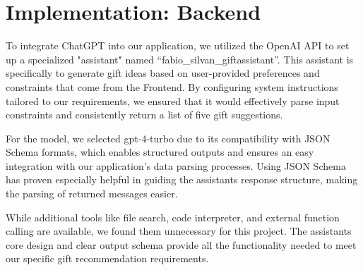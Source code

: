 \chapter{Implementation: Backend}
\label{chapter:implementation-bakend}

To integrate ChatGPT into our application, we utilized the OpenAI API to set up a specialized "assistant" named ``fabio\_silvan\_giftassistant''.
This assistant is specifically to generate gift ideas based on user-provided preferences and constraints that come from the Frontend.
By configuring system instructions tailored to our requirements, we ensured that it would effectively parse input constraints and consistently return a list of five gift suggestions.

For the model, we selected gpt-4-turbo due to its compatibility with JSON Schema formats, which enables structured outputs and ensures an easy integration with our application's data parsing processes.
Using JSON Schema has proven especially helpful in guiding the assistant\textquotesingle s response structure, making the parsing of returned messages easier.

While additional tools like file search, code interpreter, and external function calling are available, we found them unnecessary for this project.
The assistant\textquotesingle s core design and clear output schema provide all the functionality needed to meet our specific gift recommendation requirements. 
